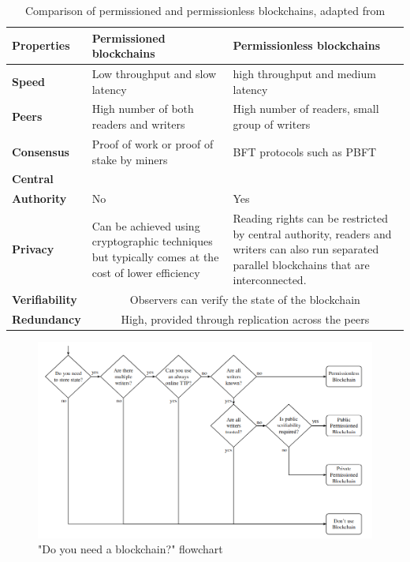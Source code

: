 \begin{table}[!h] 
    \caption{Comparison of permissioned and permissionless blockchains, adapted from \citet[p.3]{wust2017you}}
    \centering
    \label{table:permvsless}
    \begin{tabularx}{\textwidth}{>{\bfseries}lXX}
        Properties & Permissioned blockchains & Permissionless blockchains\\
        \toprule
        Speed & Low throughput and slow latency & high throughput and medium latency\\\midrule
        Peers & High number of both readers and writers & High number of readers, small group of writers\\\midrule
        Consensus & Proof of work or proof of stake by miners & BFT protocols such as PBFT\\\midrule
        Central\\Authority & No & Yes\\\midrule
        Privacy & Can be achieved using cryptographic techniques but typically comes at the cost of lower efficiency & 
        Reading rights can be restricted by central authority, readers and writers can also run separated parallel blockchains that are interconnected. \\\midrule
        Verifiability & \multicolumn{2}{c}{Observers can verify the state of the blockchain} \\\midrule
        Redundancy & \multicolumn{2}{c}{High, provided through replication across the peers}
        \\\bottomrule
    \end{tabularx}
\end{table}

\begin{figure}[!ht] 
    \centering    
    \includegraphics[width=1.0\textwidth]{blockchain_need}
    \caption["Do you need a blockchain?" flowchart]
        {"Do you need a blockchain?" flowchart \citep[p.3]{wust2017you}}
    \label{fig:LTSA}
\end{figure}

